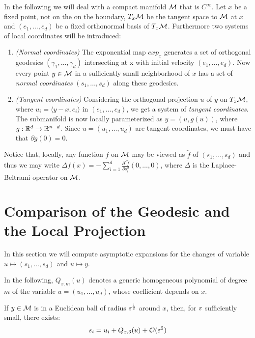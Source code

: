 In the following we will deal with a compact manifold $\mathcal{M}$ that is $C^\infty$. Let $x$ be a fixed point, not on the on the boundary, $T_x\mathcal{M}$ be the tangent space to $\mathcal{M}$ at $x$ and $(e_1,\dots,e_d)$ be a fixed orthonormal basis of $T_x\mathcal{M}$. Furthermore two systems of local coordinates will be introduced:
\begin{enumerate}
\item \textit{(Normal coordinates)} The exponential map $exp_x$ generates a set of orthogonal geodesics $(\gamma_1,\dots,\gamma_d)$ intersecting at x with initial velocity $(e_1,\dots,e_d)$. Now every point $y\in\mathcal{M}$ in a sufficiently small neighborhood of $x$ has a set of \textit{normal coordinates} $(s_1,\dots,s_d)$ along these geodesics.
\item \textit{(Tangent coordinates)} Considering the orthogonal projection $u$ of $y$ on $T_x\mathcal{M}$, where $u_i = \langle y-x,e_i\rangle$ in $(e_1,\dots,e_d)$, we get a system of \textit{tangent coordinates}. The submanifold is now locally parameterized as $y=(u,g(u))$, where $g:\mathbb{R}^d \rightarrow \mathbb{R}^{n-d}$. Since $u=(u_1,\dots,u_d)$ are tangent coordinates, we must have that $\partial g(0)=0$.
\end{enumerate}
Notice that, locally, any function $f$ on $\mathcal{M}$ may be viewed as $\tilde{f}$ of $(s_1,\dots,s_d)$ and thus we may write $\Delta f(x)=-\sum_{i=1}^d \frac{\partial^2\tilde{f}}{\partial s_i^2}(0,\dots,0)$, where $\Delta$ is the Laplace-Beltrami operator on $\mathcal{M}$.



\section{Comparison of the Geodesic and the Local Projection}
In this section we will compute asymptotic expansions for the changes of variable $u\mapsto (s_1,\dots,s_d)$ and $u\mapsto y$.

In the following, $Q_{x,m}(u)$ denotes a generic homogeneous polynomial of degree $m$ of the variable $u = (u_1,\dots,u_d)$, whose coefficient depends on $x$.

\begin{lemma}
If $y\in\mathcal{M}$ is in a Euclidean ball of radius $\varepsilon^\frac{1}{2}$ around $x$, then, for $\varepsilon$ sufficiently small, there exists:
\begin{equation}\label{eq:geodOrder3}
s_i=u_i+Q_{x,3}(u)+\mathcal{O}(\varepsilon^2)
\end{equation}
\end{lemma}

